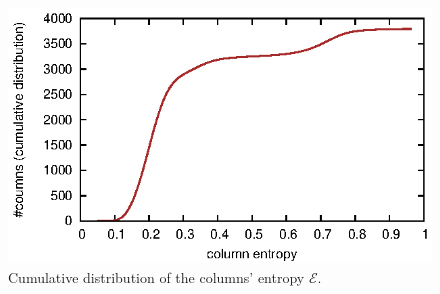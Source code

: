 %
%
\begin{figure}
\includegraphics{figs/static/cumul}
\caption{Cumulative distribution of the columns' entropy $\mathcal{E}$.}
\label{fig:cumentr}
\end{figure}


